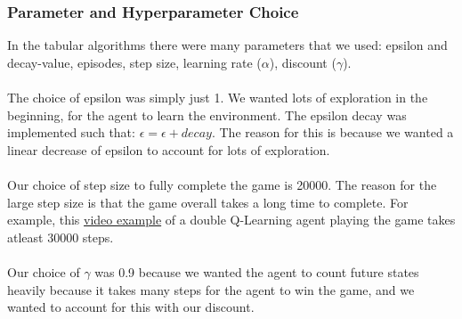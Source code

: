 \documentclass[twoside,11pt]{article}
\begin{document}
\subsubsection{Parameter and Hyperparameter Choice}
In the tabular algorithms there were many parameters that we used: epsilon and decay-value, episodes, step size, learning rate ($\alpha$),  discount ($\gamma$).
\\\\
The choice of epsilon was simply just 1. We wanted lots of exploration in the beginning, for the agent to learn the environment. The epsilon decay was implemented such that: $\epsilon = \epsilon + decay$. The reason for this is because we wanted a linear decrease of epsilon to account for lots of exploration. 
\\\\
Our choice of step size to fully complete the game is 20000. The reason for the large step size is that the game overall takes a long time to complete. For example, this \href{https://github.com/duoduocai-dot/csc498-project/blob/main/pictures_and_videos/tabular_double_q_learning_example.mkv}{video example} of a double Q-Learning agent playing the game takes atleast 30000 steps.
\\\\
Our choice of $\gamma$ was 0.9 because we wanted the agent to count future states heavily because it takes many steps for the agent to win the game, and we wanted to account for this with our discount.
\end{document}
